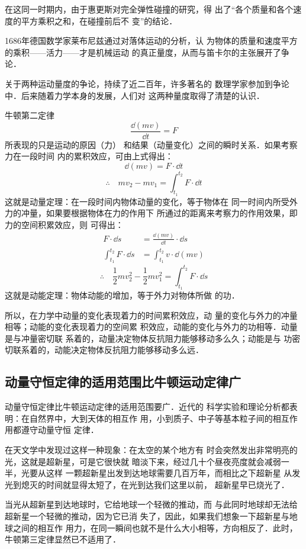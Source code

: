 在这同一时期内，由于惠更斯对完全弹性碰撞的研究，得
出了“各个质量和各个速度的平方乘积之和，在碰撞前后不
变”的结论．

1686年德国数学家莱布尼兹通过对落体运动的分析，认
为物体的质量和速度平方的乘积——活力——才是机械运动
的真正量度，从而与笛卡尔的主张展开了争论．

关于两种运动量度的争论，持续了近二百年，许多著名的
数理学家参加到争论中．后来随着力学本身的发展，人们对
这两种量度取得了清楚的认识．

牛顿第二定律
\[\frac{\dd(mv)}{\dd t}=F\]
所表现的只是运动的原因（力）
和结果（动量变化）之间的瞬时关系．如果考察力在一段时间
内的累积效应，可由上式得出：
\[\dd(mv)=F\cdot \dd t\]
\[\therefore\quad mv_2-mv_1=\int^{t_2}_{t_1}F\cdot \dd t\]
这就是动量定理：在一段时间内物体动量的变化，等于物体在
同一时间内所受外力的冲量，如果要根据物体在力的作用下
所通过的距离来考察力的作用效果，即力的空间积累效应，则
可得出：
\[\begin{split}
    F\cdot \dd s&=\frac{\dd(mv)}{\dd t}\cdot \dd s\\
    \int^{t_2}_{t_1}F\cdot \dd s&=\int^{t_2}_{t_1}v\cdot \dd (mv)
\end{split}\]
\[\therefore\quad \frac{1}{2}mv^2_2-\frac{1}{2}mv^2_1=\int^{t_2}_{t_1}F\cdot \dd s\]
这就是动能定理：物体动能的增加，等于外力对物体所做
的功．

所以，在力学中动量的变化表现着力的时间累积效应，动
量的变化与外力的冲量相等；动能的变化表现着力的空间累
积效应，动能的变化与外力的功相等．动量是与冲量密切联
系着的，动量决定物体反抗阻力能够移动多么久；动能是与
功密切联系着的，动能决定物体反抗阻力能够移动多么远．


\subsection{动量守恒定律的适用范围比牛顿运动定律广}
动量守恒定律比牛顿运动定律的适用范围要广．近代的
科学实验和理论分析都表明：在自然界中，大到天体的相互作
用，小到质子、中子等基本粒子间的相互作用都遵守动量守恒
定律．

在天文学中发现过这样一种现象：在太空的某个地方有
时会突然发出非常明亮的光，这就是超新星，可是它很快就
暗淡下来，经过几十个昼夜亮度就会减弱一半，光要从这样
一颗超新星出发到达地球需要几百万年，而相比之下超新星
从发光到熄灭的时间就显得太短了，在光到达我们这里以前，
超新星早已烧光了．

当光从超新星到达地球时，它给地球一个轻微的推动，而
与此同时地球却无法给超新星一个轻微的推动，因为它已消
失了，因此，如果我们想象一下超新星与地球之间的相互作
用力，在同一瞬间也就不是什么大小相等，方向相反了．此时，
牛顿第三定律显然已不适用了．

